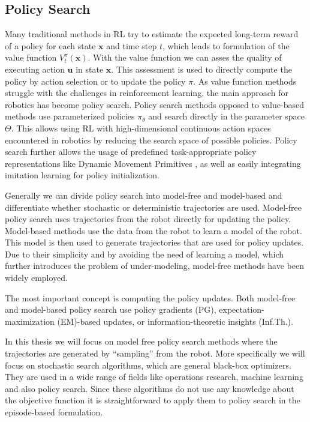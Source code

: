 \subsection{Policy Search}
Many traditional methods in RL try to estimate the
expected long-term reward of a policy for each state $\mathbf{x}$
and time step $t$, which leads to formulation of the value function $V^{\pi}_t(\mathbf{x})$.
With the value function we can asses the quality of executing action
$\mathbf{u}$ in state $\mathbf{x}$. This assessment is used
to directly compute the policy by action selection or to update
the policy $\pi$. As value function methods struggle with the
challenges in reinforcement learning, the main approach
for robotics has become policy search.
Policy search methods opposed to value-based methods
use parameterized policies $\pi_{\theta}$ and search
directly in the parameter space $\Theta$. This allows using RL with
high-dimensional continuous action spaces encountered
in robotics by reducing the search space of possible policies.
Policy search further allows the usage of predefined
task-appropriate policy representations like Dynamic
Movement Primitives \citep{schaal2005learning}, as well
as easily integrating imitation learning
for policy initialization.

Generally we can divide policy search into model-free and model-based and
differentiate whether stochastic or deterministic trajectories are used.
Model-free policy search uses trajectories from the robot directly
for updating the policy. Model-based methods use the data
from the robot to learn a model of the robot. This model is then used
to generate trajectories that are used for policy updates.
Due to their simplicity and by avoiding the need of learning a model,
which further introduces the problem of under-modeling,
model-free methods have been widely employed.


The most important concept is computing the policy updates.
Both model-free and model-based policy search use policy gradients (PG),
expectation-maximization (EM)-based updates, or
information-theoretic insights (Inf.Th.).

In this thesis we will focus on model free policy search methods
where the trajectories are generated by ``sampling'' from
the robot.
More specifically we will focus on stochastic
search algorithms, which are general black-box optimizers.
They are used in a wide range of fields like operations research,
machine learning and also policy search.
Since these algorithms do not use any knowledge about the
objective function it is straightforward to
apply them to policy search in the episode-based formulation.

